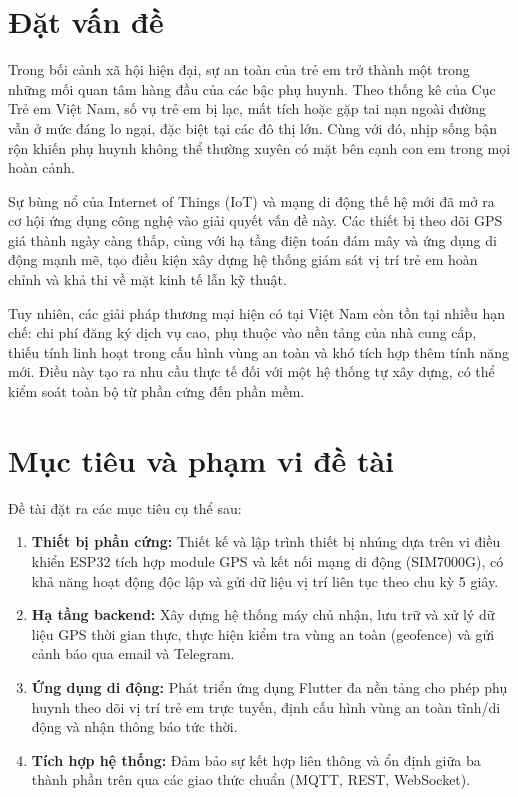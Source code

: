 \documentclass[../DoAn.tex]{subfiles}
\begin{document}
\section{Đặt vấn đề}

Trong bối cảnh xã hội hiện đại, sự an toàn của trẻ em trở thành một trong những mối quan tâm hàng đầu của các bậc phụ huynh. Theo thống kê của Cục Trẻ em Việt Nam, số vụ trẻ em bị lạc, mất tích hoặc gặp tai nạn ngoài đường vẫn ở mức đáng lo ngại, đặc biệt tại các đô thị lớn. Cùng với đó, nhịp sống bận rộn khiến phụ huynh không thể thường xuyên có mặt bên cạnh con em trong mọi hoàn cảnh.

Sự bùng nổ của Internet of Things (IoT) và mạng di động thế hệ mới đã mở ra cơ hội ứng dụng công nghệ vào giải quyết vấn đề này. Các thiết bị theo dõi GPS giá thành ngày càng thấp, cùng với hạ tầng điện toán đám mây và ứng dụng di động mạnh mẽ, tạo điều kiện xây dựng hệ thống giám sát vị trí trẻ em hoàn chỉnh và khả thi về mặt kinh tế lẫn kỹ thuật.

Tuy nhiên, các giải pháp thương mại hiện có tại Việt Nam còn tồn tại nhiều hạn chế: chi phí đăng ký dịch vụ cao, phụ thuộc vào nền tảng của nhà cung cấp, thiếu tính linh hoạt trong cấu hình vùng an toàn và khó tích hợp thêm tính năng mới. Điều này tạo ra nhu cầu thực tế đối với một hệ thống tự xây dựng, có thể kiểm soát toàn bộ từ phần cứng đến phần mềm.

\section{Mục tiêu và phạm vi đề tài}

Đề tài đặt ra các mục tiêu cụ thể sau:

\begin{enumerate}
  \item \textbf{Thiết bị phần cứng:} Thiết kế và lập trình thiết bị nhúng dựa trên vi điều khiển ESP32 tích hợp module GPS và kết nối mạng di động (SIM7000G), có khả năng hoạt động độc lập và gửi dữ liệu vị trí liên tục theo chu kỳ 5 giây.

  \item \textbf{Hạ tầng backend:} Xây dựng hệ thống máy chủ nhận, lưu trữ và xử lý dữ liệu GPS thời gian thực, thực hiện kiểm tra vùng an toàn (geofence) và gửi cảnh báo qua email và Telegram.

  \item \textbf{Ứng dụng di động:} Phát triển ứng dụng Flutter đa nền tảng cho phép phụ huynh theo dõi vị trí trẻ em trực tuyến, định cấu hình vùng an toàn tĩnh/di động và nhận thông báo tức thời.

  \item \textbf{Tích hợp hệ thống:} Đảm bảo sự kết hợp liên thông và ổn định giữa ba thành phần trên qua các giao thức chuẩn (MQTT, REST, WebSocket).
\end{enumerate}
\end{document}
